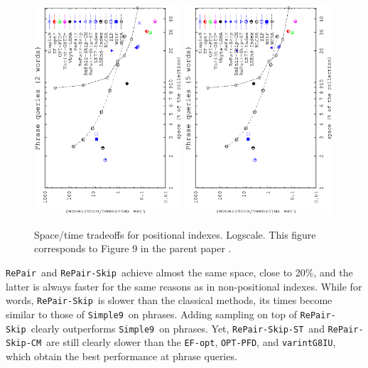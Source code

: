 \documentclass[review]{elsarticle}
\newcommand{\simplen}{\texttt{Simple9}}
\newcommand{\repairNo}{\texttt{RePair}}
\newcommand{\repairSkip}{\texttt{RePair-Skip}}
\newcommand{\repairSkipCM}{\texttt{RePair-Skip-CM}}
\newcommand{\repairSkipST}{\texttt{RePair-Skip-ST}}
\newcommand{\efopt}{\texttt{EF-opt}}
\newcommand{\optpfd}{\texttt{OPT-PFD}}
\newcommand{\varint}{\texttt{varintG8IU}}
\begin{document}
\begin{figure}[t]
\begin{center}
\includegraphics[angle=-90,width=0.49\textwidth]{../figures/f4/phrases2-2/locate-2_2.eps}
\includegraphics[angle=-90,width=0.49\textwidth]{../figures/f4/phrases5-5/locate-5_5.eps}
\caption{Space/time tradeoffs for positional indexes. Logscale. This figure corresponds to Figure 9 in the parent paper \cite{CFMNis16.3}.}
\label{fig:pos2.2}
\end{center}
\end{figure}



\repairNo\ and \repairSkip\ achieve almost the same space, %
close to 20\%,
and the latter is always faster for the same reasons as in
non-positional indexes. While for words, \repairSkip\ is slower than the 
classical methods, its times become similar to those of \simplen\ on phrases. Adding sampling on 
top of \repairSkip\ clearly outperforms \simplen\ on phrases. 
Yet, \repairSkipST\ and \repairSkipCM\ are still clearly slower than the \efopt, \optpfd, and \varint, which obtain the best performance at phrase queries.
\end{document}
